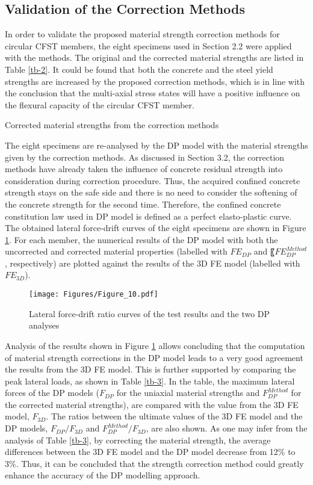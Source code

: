 \documentclass[12pt,a4]{article}
\begin{document}
	\subsection{Validation of the Correction Methods}
	In order to validate the proposed material strength correction methods for circular CFST members, the eight specimens used in Section 2.2 were applied with the methods. The original and the corrected material strengths are listed in Table \ref{tb-2}. It could be found that both the concrete and the steel yield strengths are increased by the proposed correction methods, which is in line with the conclusion that the multi-axial stress states will have a positive influence on the flexural capacity of the circular CFST member.
	\par
	\begin{table}
		\caption{Corrected material strengths from the correction methods}
		\label{tb-2}
	\end{table}
	\par
	The eight specimens are re-analysed by the DP model with the material strengths given by the correction methods. As discussed in Section 3.2, the correction methods have already taken the influence of concrete residual strength into consideration during correction procedure. Thus, the acquired confined concrete strength stays on the safe side and there is no need to consider the softening of the concrete strength for the second time. Therefore, the confined concrete constitution law used in DP model is defined as a perfect elasto-plastic curve. The obtained lateral force-drift curves of the eight specimens are shown in Figure \ref{fig-9}. For each member, the numerical results of the DP model with both the uncorrected and corrected material properties (labelled with $FE_{DP}$ and 〖$FE_{DP}^{Method}$, respectively) are plotted against the results of the 3D FE model (labelled with $FE_{3D}$).
	\par
	\begin{figure}[h]
		\centering
		\texttt{[image: Figures/Figure\_10.pdf]}
		\caption{Lateral force-drift ratio curves of the test results and the two DP analyses}
		\label{fig-9}
	\end{figure}
	\par
	Analysis of the results shown in Figure \ref{fig-9} allows concluding that the computation of material strength corrections in the DP model leads to a very good agreement the results from the 3D FE model. This is further supported by comparing the peak lateral loads, as shown in Table \ref{tb-3}. In the table, the maximum lateral forces of the DP models ($F_{DP}$ for the uniaxial material strengths and $F_{DP}^{Method}$ for the corrected material strengths), are compared with the value from the 3D FE model, $F_{3D}$. The ratios between the ultimate values of the 3D FE model and the DP models, $F_{DP}/F_{3D}$ and $F_{DP}^{Method}/F_{3D}$, are also shown. As one may infer from the analysis of Table \ref{tb-3}, by correcting the material strength, the average differences between the 3D FE model and the DP model decrease from 12\% to 3\%. Thus, it can be concluded that the strength correction method could greatly enhance the accuracy of the DP modelling approach. 
\end{document}
